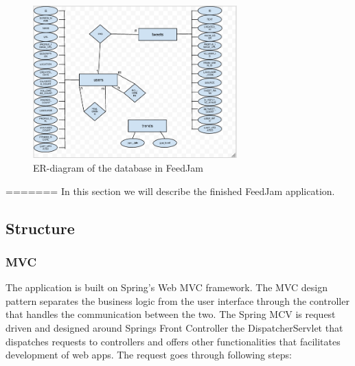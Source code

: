 \begin{figure}[ht]
    \begin{minipage}[b]{1\linewidth}
        \centering
        \includegraphics[width=0.7\textwidth]{figures/erDiagram}
        \caption{ER-diagram of the database in FeedJam}
        \label{fig:erDiagram}
    \end{minipage}
\end{figure}








=======
In this section we will describe the finished FeedJam application.
\subsection{Structure}

\subsubsection{MVC} %
\label{sec:MVC}
The application is built on Spring's Web MVC framework. The MVC design pattern separates the business logic from the user interface through the controller that handles the communication between the two. The Spring MCV is request driven and designed around Springs Front Controller the DispatcherServlet that dispatches requests to controllers and offers other functionalities that facilitates development of web apps. The request goes through following steps:

